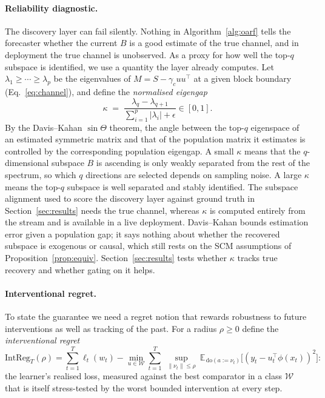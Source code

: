 \documentclass[11pt]{article}
\theoremstyle{plain}
\theoremstyle{remark}
\newcommand{\E}{\mathbb{E}}
\newcommand{\doop}{\mathrm{do}}
\begin{document}
\paragraph{Reliability diagnostic.} The discovery layer can fail silently. Nothing in
Algorithm~\ref{alg:oarf} tells the forecaster whether the current $B$ is a good
estimate of the true channel, and in deployment the true channel is unobserved. As a
proxy for how well the top-$q$ subspace is identified, we use a quantity the layer
already computes. Let $\lambda_1\ge\cdots\ge\lambda_p$ be the eigenvalues of
$M=S-\gamma_c uu^\top$ at a given block boundary (Eq.~\eqref{eq:channel}), and define
the \emph{normalised eigengap}
\begin{equation}\label{eq:eigengap}
 \kappa \;=\; \frac{\lambda_q-\lambda_{q+1}}{\sum_{i=1}^p|\lambda_i|+\epsilon}\in[0,1].
\end{equation}
By the Davis--Kahan $\sin\Theta$ theorem, the angle between the top-$q$ eigenspace of
an estimated symmetric matrix and that of the population matrix it estimates is
controlled by the corresponding population eigengap. A small $\kappa$ means that the $q$-dimensional subspace $B$ is ascending is only weakly separated from
the rest of the spectrum, so which $q$ directions are selected depends on sampling
noise. A large $\kappa$ means the top-$q$ subspace is well separated and stably
identified. The subspace alignment used to score the discovery layer against ground
truth in Section~\ref{sec:results} needs the true channel, whereas $\kappa$ is
computed entirely from the stream and is available in a live deployment.
Davis--Kahan bounds estimation error given a population gap; it says nothing about
whether the recovered subspace is exogenous or causal, which still rests on the SCM
assumptions of Proposition~\ref{prop:equiv}. Section~\ref{sec:results} tests whether
$\kappa$ tracks true recovery and whether gating on it helps.

\paragraph{Interventional regret.} To state the guarantee we need a regret notion that
rewards robustness to future interventions as well as tracking of the past. For a
radius $\rho\ge 0$ define the \emph{interventional regret}
\begin{equation}\label{eq:intreg}
\mathrm{IntReg}_T(\rho)=\sum_{t=1}^T\ell_t(w_t)
 -\min_{u\in\mathcal{W}}\sum_{t=1}^T\ \sup_{\|\nu_t\|\le\rho}\
 \E_{\,\doop(a:=\nu_t)}\!\big[(y_t-u_t^\top\phi(x_t))^2\big]:
\end{equation}
the learner's realised loss, measured against the best comparator in a class
$\mathcal{W}$ that is itself stress-tested by the worst bounded intervention at every
step.
\end{document}
